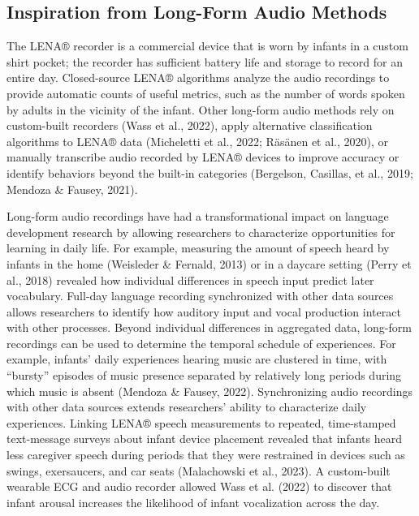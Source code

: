 \documentclass[
  man]{apa6}
\begin{document}
\hypertarget{inspiration-from-long-form-audio-methods}{%
\subsection{Inspiration from Long-Form Audio Methods}\label{inspiration-from-long-form-audio-methods}}

The LENA® recorder is a commercial device that is worn by infants in a custom shirt pocket; the recorder has sufficient battery life and storage to record for an entire day. Closed-source LENA® algorithms analyze the audio recordings to provide automatic counts of useful metrics, such as the number of words spoken by adults in the vicinity of the infant. Other long-form audio methods rely on custom-built recorders (Wass et al., 2022), apply alternative classification algorithms to LENA® data (Micheletti et al., 2022; Räsänen et al., 2020), or manually transcribe audio recorded by LENA® devices to improve accuracy or identify behaviors beyond the built-in categories (Bergelson, Casillas, et al., 2019; Mendoza \& Fausey, 2021).

Long-form audio recordings have had a transformational impact on language development research by allowing researchers to characterize opportunities for learning in daily life. For example, measuring the amount of speech heard by infants in the home (Weisleder \& Fernald, 2013) or in a daycare setting (Perry et al., 2018) revealed how individual differences in speech input predict later vocabulary. Full-day language recording synchronized with other data sources allows researchers to identify how auditory input and vocal production interact with other processes. Beyond individual differences in aggregated data, long-form recordings can be used to determine the temporal schedule of experiences. For example, infants' daily experiences hearing music are clustered in time, with ``bursty'' episodes of music presence separated by relatively long periods during which music is absent (Mendoza \& Fausey, 2022). Synchronizing audio recordings with other data sources extends researchers' ability to characterize daily experiences. Linking LENA® speech measurements to repeated, time-stamped text-message surveys about infant device placement revealed that infants heard less caregiver speech during periods that they were restrained in devices such as swings, exersaucers, and car seats (Malachowski et al., 2023). A custom-built wearable ECG and audio recorder allowed Wass et al. (2022) to discover that infant arousal increases the likelihood of infant vocalization across the day.
\end{document}
